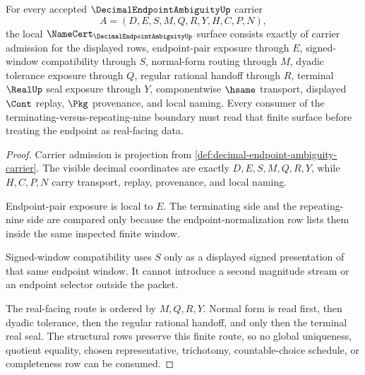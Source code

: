 \begin{theorem}
\label{thm:decimal-endpoint-ambiguity-namecert-obligations}
For every accepted $\DecimalEndpointAmbiguityUp$ carrier
$$
A=(D,E,S,M,Q,R,Y,H,C,P,N),
$$
the local $\NameCert_{\DecimalEndpointAmbiguityUp}$ surface consists exactly
of carrier admission for the displayed rows, endpoint-pair exposure through
$E$, signed-window compatibility through $S$, normal-form routing through
$M$, dyadic tolerance exposure through $Q$, regular rational handoff through
$R$, terminal $\RealUp$ seal exposure through $Y$, componentwise $\hsame$
transport, displayed $\Cont$ replay, $\Pkg$ provenance, and local naming.
Every consumer of the terminating-versus-repeating-nine boundary must read
that finite surface before treating the endpoint as real-facing data.
\end{theorem}
\begin{proof}
Carrier admission is projection from
\autoref{def:decimal-endpoint-ambiguity-carrier}. The visible decimal
coordinates are exactly $D,E,S,M,Q,R,Y$, while $H,C,P,N$ carry transport,
replay, provenance, and local naming.

Endpoint-pair exposure is local to $E$. The terminating side and the
repeating-nine side are compared only because the endpoint-normalization row
lists them inside the same inspected finite window.

Signed-window compatibility uses $S$ only as a displayed signed presentation
of that same endpoint window. It cannot introduce a second magnitude stream or
an endpoint selector outside the packet.

The real-facing route is ordered by $M,Q,R,Y$. Normal form is read first,
then dyadic tolerance, then the regular rational handoff, and only then the
terminal real seal. The structural rows preserve this finite route, so no
global uniqueness, quotient equality, chosen representative, trichotomy,
countable-choice schedule, or completeness row can be consumed.
\end{proof}

